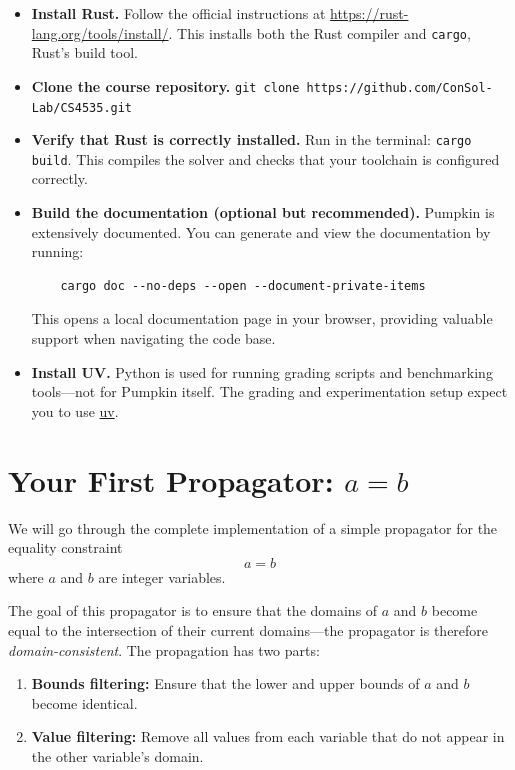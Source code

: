 \documentclass{article}
\begin{document}
\begin{itemize}
    \item \textbf{Install Rust.}  
    Follow the official instructions at  
    \href{https://rust-lang.org/tools/install/}{https://rust-lang.org/tools/install/}.  
    This installs both the Rust compiler and \texttt{cargo}, Rust’s build tool.

    \item \textbf{Clone the course repository.}  
    \texttt{git clone https://github.com/ConSol-Lab/CS4535.git}

    \item \textbf{Verify that Rust is correctly installed.}  
    Run in the terminal:  
    \texttt{cargo build}.  
    This compiles the solver and checks that your toolchain is configured correctly.
    \item \textbf{Build the documentation (optional but recommended).}  
    Pumpkin is extensively documented. You can generate and view the documentation by running:  
    \begin{verbatim}
    cargo doc --no-deps --open --document-private-items
    \end{verbatim}
    This opens a local documentation page in your browser, providing valuable support when navigating the code base.
    \item \textbf{Install UV.}  
    Python is used for running grading scripts and benchmarking tools—not for Pumpkin itself.  
    The grading and experimentation setup expect you to use \href{https://docs.astral.sh/uv/}{uv}.
\end{itemize}

\section{Your First Propagator: \texorpdfstring{$a = b$}{a = b}}

We will go through the complete implementation of a simple propagator for the equality constraint
\[a = b\]
where $a$ and $b$ are integer variables.

The goal of this propagator is to ensure that the domains of $a$ and $b$ become equal to the intersection of their current domains—the propagator is therefore \emph{domain-consistent}. 
The propagation has two parts:

\begin{enumerate}
    \item 
        \textbf{Bounds filtering:}  
          Ensure that the lower and upper bounds of $a$ and $b$ become identical.
    \item 
        \textbf{Value filtering:}  
          Remove all values from each variable that do not appear in the other variable’s domain.
\end{enumerate}
\end{document}
